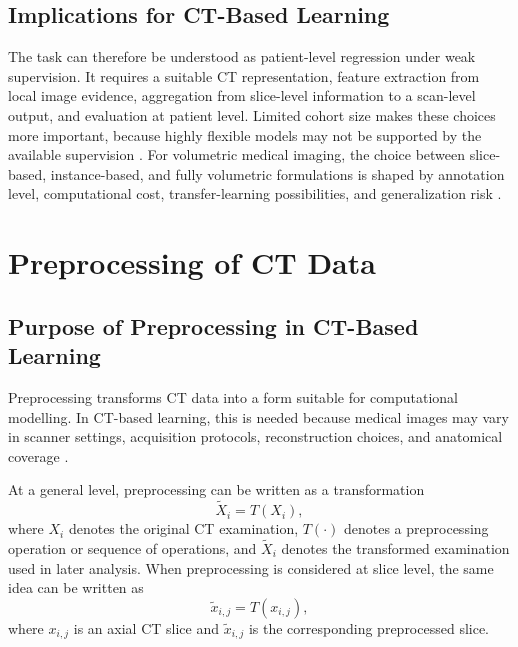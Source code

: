 \subsection{Implications for CT-Based Learning}
\label{sec:implications_ct_learning}

The task can therefore be understood as patient-level regression under weak supervision. It requires a suitable CT representation, feature extraction from local image evidence, aggregation from slice-level information to a scan-level output, and evaluation at patient level. Limited cohort size makes these choices more important, because highly flexible models may not be supported by the available supervision \cite{dhiman2023samplesize,litjens2017survey}. For volumetric medical imaging, the choice between slice-based, instance-based, and fully volumetric formulations is shaped by annotation level, computational cost, transfer-learning possibilities, and generalization risk \cite{wang2023twoseventyfive}.








\section{Preprocessing of CT Data}
\label{sec:preprocessing_ct_data}

\subsection{Purpose of Preprocessing in CT-Based Learning}
\label{sec:purpose_preprocessing_ct}

Preprocessing transforms CT data into a form suitable for computational modelling. In CT-based learning, this is needed because medical images may vary in scanner settings, acquisition protocols, reconstruction choices, and anatomical coverage \cite{rizzo2018radiomics,litjens2017survey}.

At a general level, preprocessing can be written as a transformation
\[
\tilde{X}_i = T(X_i),
\]
where \(X_i\) denotes the original CT examination, \(T(\cdot)\) denotes a preprocessing operation or sequence of operations, and \(\tilde{X}_i\) denotes the transformed examination used in later analysis. When preprocessing is considered at slice level, the same idea can be written as
\[
\tilde{x}_{i,j} = T(x_{i,j}),
\]
where \(x_{i,j}\) is an axial CT slice and \(\tilde{x}_{i,j}\) is the corresponding preprocessed slice.

